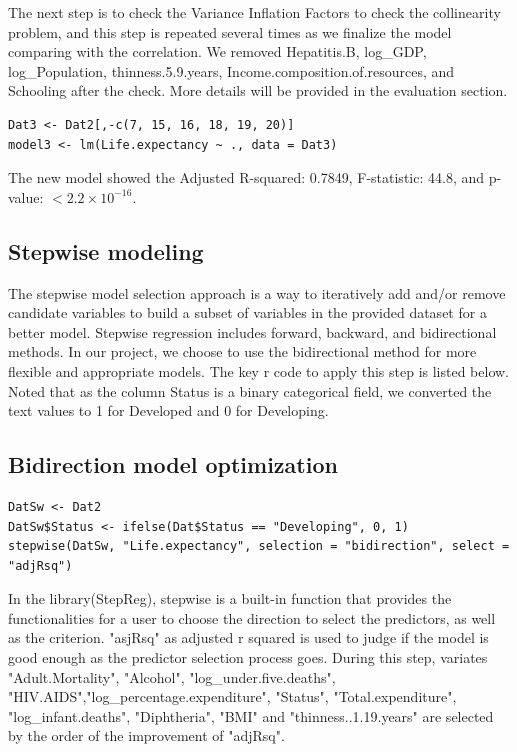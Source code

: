 The next step is to check the Variance Inflation Factors to check the collinearity problem, and this step is repeated several times as we finalize the model comparing with the correlation. We removed Hepatitis.B, log\_GDP, log\_Population, thinness.5.9.years, Income.composition.of.resources, and Schooling after the check. More details will be provided in the evaluation section.


\begin{verbatim}
Dat3 <- Dat2[,-c(7, 15, 16, 18, 19, 20)]
model3 <- lm(Life.expectancy ~ ., data = Dat3)
\end{verbatim}
The new model showed the Adjusted R-squared: 0.7849, F-statistic:  44.8, and p-value: $< 2.2\times 10^{-16}$.


\subsection{Stepwise modeling}

The stepwise model selection approach is a way to iteratively add and/or remove candidate variables to build a subset of variables in the provided dataset for a better model. Stepwise regression includes forward, backward, and bidirectional methods. In our project, we choose to use the bidirectional method for more flexible and appropriate models. The key r code to apply this step is listed below. Noted that as the column Status is a binary categorical field, we converted the text values to 1 for Developed and 0 for Developing.

\subsection{Bidirection model optimization}

\begin{verbatim}
DatSw <- Dat2
DatSw$Status <- ifelse(Dat$Status == "Developing", 0, 1)
stepwise(DatSw, "Life.expectancy", selection = "bidirection", select = "adjRsq")
\end{verbatim}

In the library(StepReg), stepwise is a built-in function that provides the functionalities for a user to choose the direction to select the predictors, as well as the criterion. "asjRsq" as adjusted r squared is used to judge if the model is good enough as the predictor selection process goes. During this step, variates "Adult.Mortality", "Alcohol", "log\_under.five.deaths", "HIV.AIDS","log\_percentage.expenditure", "Status", "Total.expenditure", "log\_infant.deaths", "Diphtheria", "BMI" and "thinness..1.19.years" are selected by the order of the improvement of "adjRsq".

